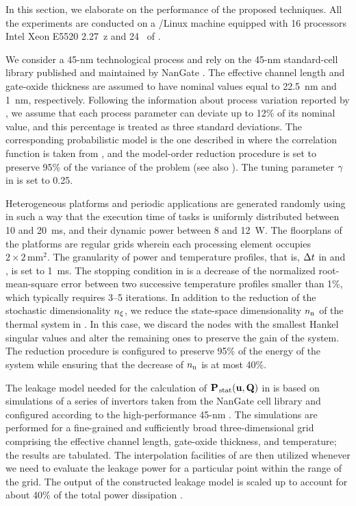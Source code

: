 In this section, we elaborate on the performance of the proposed techniques.
All the experiments are conducted on a /Linux machine equipped with 16 processors Intel Xeon E5520 2.27~z and 24~ of .

We consider a 45-nm technological process and rely on the 45-nm standard-cell library published and maintained by NanGate \cite{nangate}.
The effective channel length and gate-oxide thickness are assumed to have nominal values equal to 22.5~nm and 1~nm, respectively.
Following the information about process variation reported by  \cite{itrs}, we assume that each process parameter can deviate up to 12\% of its nominal value, and this percentage is treated as three standard deviations.
The corresponding probabilistic model is the one described in  where the correlation function is taken from \cite{ukhov2014}, and the model-order reduction procedure is set to preserve 95\% of the variance of the problem (see also ).
The tuning parameter $\gamma$ in  is set to 0.25.

Heterogeneous platforms and periodic applications are generated randomly using  \cite{dick1998} in such a way that the execution time of tasks is uniformly distributed between 10 and 20~ms, and their dynamic power between 8 and 12~W.
The floorplans of the platforms are regular grids wherein each processing element occupies $2 \times 2\,\text{mm}^2$.
The granularity of power and temperature profiles, that is, $\Delta t$ in  and , is set to 1~ms.
The stopping condition in  is a decrease of the normalized root-mean-square error between two successive temperature profiles smaller than 1\%, which typically requires 3--5 iterations.
In addition to the reduction of the stochastic dimensionality ${n_\xi}$, we reduce the state-space dimensionality ${n_\text{n}}$ of the thermal system in .
In this case, we discard the nodes with the smallest Hankel singular values and alter the remaining ones to preserve the  gain of the system.
The reduction procedure is configured to preserve 95\% of the energy of the system while ensuring that the decrease of ${n_\text{n}}$ is at most 40\%.

The leakage model needed for the calculation of $\mathbf{P}_{\text{\kern0.1emstat}}(\mathbf{u}, \mathbf{Q})$ in  is based on  simulations of a series of  invertors taken from the NanGate cell library and configured according to the high-performance 45-nm  \cite{ptm}.
The simulations are performed for a fine-grained and sufficiently broad three-dimensional grid comprising the effective channel length, gate-oxide thickness, and temperature; the results are tabulated.
The interpolation facilities of  \cite{matlab} are then utilized whenever we need to evaluate the leakage power for a particular point within the range of the grid.
The output of the constructed leakage model is scaled up to account for about 40\% of the total power dissipation \cite{liu2007}.

